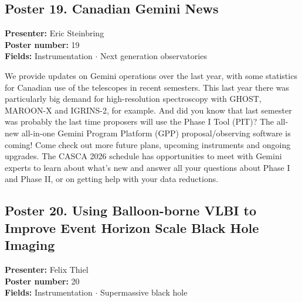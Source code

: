 \subsection*{Poster 19. Canadian Gemini News}
\textbf{Presenter:} Eric Steinbring\\
\textbf{Poster number:} 19\\
\textbf{Fields:} Instrumentation $\cdot$ Next generation observatories

We provide updates on Gemini operations over the last year, with some statistics for Canadian use of the telescopes in recent semesters. This last year there was particularly big demand for high-resolution spectroscopy with GHOST, MAROON-X and IGRINS-2, for example. And did you know that last semester was probably the last time proposers will use the Phase I Tool (PIT)? The all-new all-in-one Gemini Program Platform (GPP) proposal/observing software is coming! Come check out more future plans, upcoming instruments and ongoing upgrades. The CASCA 2026 schedule has opportunities to meet with Gemini experts to learn about what's new and answer all your questions about Phase I and Phase II, or on getting help with your data reductions.

\hypertarget{poster-abstract-talk-64}{}\label{poster-abstract-page-talk-64}
\subsection*{Poster 20. Using Balloon-borne VLBI to Improve Event Horizon Scale Black Hole Imaging}
\textbf{Presenter:} Felix Thiel\\
\textbf{Poster number:} 20\\
\textbf{Fields:} Instrumentation $\cdot$ Supermassive black hole

